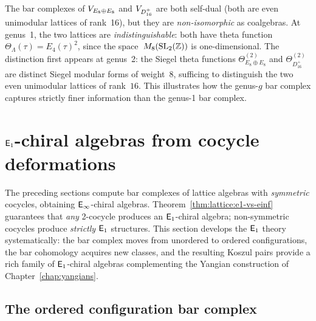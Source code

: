 \begin{remark}
The bar complexes of $V_{E_8 \oplus E_8}$ and $V_{D_{16}^+}$ are both self-dual (both are even unimodular lattices of rank~16), but they are \emph{non-isomorphic} as coalgebras.  At genus~1, the two lattices are \emph{indistinguishable}: both have theta function $\Theta_\Lambda(\tau) = E_4(\tau)^2$, since the space~$M_8(\mathrm{SL}_2(\mathbb{Z}))$ is one-dimensional.  The distinction first appears at genus~2: the Siegel theta functions $\Theta^{(2)}_{E_8 \oplus E_8}$ and $\Theta^{(2)}_{D_{16}^+}$ are distinct Siegel modular forms of weight~8, sufficing to distinguish the two even unimodular lattices of rank~$16$.  This illustrates how the genus-$g$ bar complex captures strictly finer information than the genus-1 bar complex.
\end{remark}



\section{$\mathsf{E}_1$-chiral algebras from cocycle deformations}
\label{sec:lattice:e1-families}

The preceding sections compute bar complexes of lattice algebras with
\emph{symmetric} cocycles, obtaining $\mathsf{E}_{\infty}$-chiral algebras.
Theorem~\ref{thm:lattice:e1-vs-einf} guarantees that \emph{any}
2-cocycle produces an $\mathsf{E}_1$-chiral algebra; non-symmetric cocycles
produce \emph{strictly} $\mathsf{E}_1$ structures.  This section develops
the $\mathsf{E}_1$ theory systematically: the bar complex moves from
unordered to ordered configurations, the bar cohomology acquires new
classes, and the resulting Koszul pairs provide a rich family of
$\mathsf{E}_1$-chiral algebras complementing the Yangian construction of
Chapter~\ref{chap:yangians}.



\subsection{The ordered configuration bar complex}


